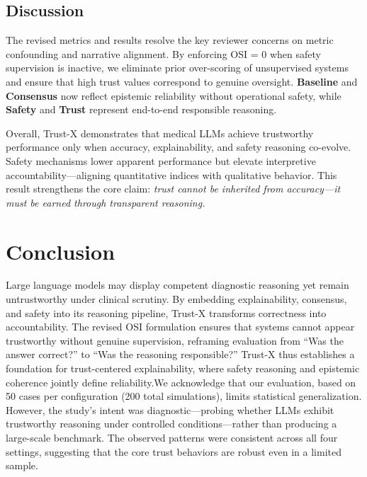 \documentclass[letterpaper]{article} %
\begin{document}
\subsection{Discussion}

The revised metrics and results resolve the key reviewer concerns on metric confounding and narrative alignment.  
By enforcing OSI = 0 when safety supervision is inactive, we eliminate prior over-scoring of unsupervised systems and ensure that high trust values correspond to genuine oversight.  
\textbf{Baseline} and \textbf{Consensus} now reflect epistemic reliability without operational safety, while \textbf{Safety} and \textbf{Trust} represent end-to-end responsible reasoning.

Overall, Trust-X demonstrates that medical LLMs achieve trustworthy performance only when accuracy, explainability, and safety reasoning co-evolve.  
Safety mechanisms lower apparent performance but elevate interpretive accountability—aligning quantitative indices with qualitative behavior.  
This result strengthens the core claim: \emph{trust cannot be inherited from accuracy—it must be earned through transparent reasoning.}

\section{Conclusion}
\label{sec:conclusion}

Large language models may display competent diagnostic reasoning yet remain untrustworthy under clinical scrutiny.  
By embedding explainability, consensus, and safety into its reasoning pipeline, Trust-X transforms correctness into accountability.  
The revised OSI formulation ensures that systems cannot appear trustworthy without genuine supervision, reframing evaluation from ``Was the answer correct?'' to ``Was the reasoning responsible?''  
Trust-X thus establishes a foundation for trust-centered explainability, where safety reasoning and epistemic coherence jointly define reliability.We acknowledge that our evaluation, based on 50 cases per configuration (200 total simulations), limits statistical generalization. 
However, the study’s intent was diagnostic—probing whether LLMs exhibit trustworthy reasoning under controlled conditions—rather than producing a large-scale benchmark. 
The observed patterns were consistent across all four settings, suggesting that the core trust behaviors are robust even in a limited sample.
\end{document}
